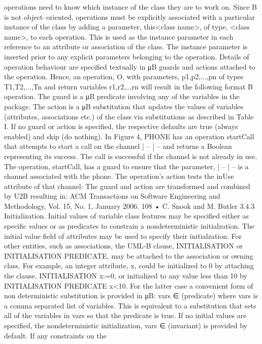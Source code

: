 operations need to know which instance of the class they are to work on. Since
B is not object–oriented, operations must be explicitly associated with a particular instance of the class by adding a parameter, this<class name>, of type,
<class name>, to each operation. This is used as the instance parameter in
each reference to an attribute or association of the class. The instance parameter is inserted prior to any explicit parameters belonging to the operation.
Details of operation behaviour are specified textually in μB guards and actions
attached to the operation. Hence, an operation, O, with parameters, p1,p2,...,pn
of types T1,T2,...,Tn and return variables r1,r2,..,rn will result in the following
format B operation.
The guard is a μB predicate involving any of the variables in the package.
The action is a μB substitution that updates the values of variables (attributes,
associations etc.) of the class via substitutions as described in Table I. If no
guard or action is specified, the respective defaults are true (always enabled)
and skip (do nothing).
In Figure 4, PHONE has an operation startCall that attempts to start a call
on the channel |
-- |
-- and returns a Boolean representing its success. The call is
successful if the channel is not already in use.
The operation, startCall, has a guard to ensure that the parameter, |
-- |
-- is a
channel associated with the phone.
The operation’s action tests the inUse attribute of that channel:
The guard and action are transformed and combined by U2B resulting in:
ACM Transactions on Software Engineering and Methodology, Vol. 15, No. 1, January 2006.
108 • C. Snook and M. Butler
3.4.3 Initialization. Initial values of variable class features may be specified either as specific values or as predicates to constrain a nondeterministic
initialzation. The initial value field of attributes may be used to specify their
initialzation. For other entities, such as associations, the UML-B clause, INITIALISATION or INITIALISATION PREDICATE, may be attached to the association or
owning class. For example, an integer attribute, x, could be initialized to 0 by
attaching the clause, INITIALISATION x:=0, or initialized to any value less than 10
by INITIALISATION PREDICATE x<10. For the latter case a convenient form of non
deterministic substitution is provided in μB:
vars ∈ (predicate) where vars is a comma separated list of variables.
This is equivalent to a substitution that sets all of the variables in vars so
that the predicate is true. If no initial values are specified, the nondeterministic
initialization, vars ∈ (invariant) is provided by default. If any constraints on the
